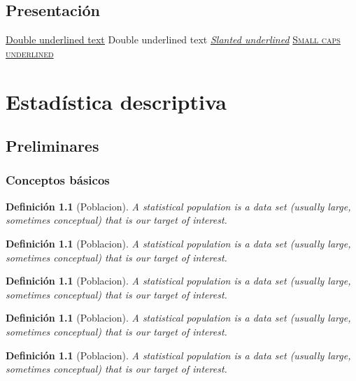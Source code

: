 \documentclass[a4paper]{report}
\newtheorem{defn}[thm]{Definición}
\begin{document}
\renewcommand\listtablename{Lista de tablas}
\listoftables
\newpage

\clearpage

\chapter*{Presentación}

\underline{\underline{Double underlined text}}
{Double underlined text}
\textsl{\underline{Slanted underlined}}
\textsc{\underline{Small caps underlined}}









\part{Estadística descriptiva}
\setcounter{page}{1}

\chapter{Preliminares}

\section{Conceptos básicos}

\begin{defn}[Poblacion]
  A statistical population is a data set (usually large, sometimes conceptual) that is our target of interest.
\end{defn}


\begin{defn}[Poblacion]
  A statistical population is a data set (usually large, sometimes conceptual) that is our target of interest.
\end{defn}
\begin{defn}[Poblacion]
  A statistical population is a data set (usually large, sometimes conceptual) that is our target of interest.
\end{defn}
\begin{defn}[Poblacion]
  A statistical population is a data set (usually large, sometimes conceptual) that is our target of interest.
\end{defn}
\begin{defn}[Poblacion]
  A statistical population is a data set (usually large, sometimes conceptual) that is our target of interest.
\end{defn}
\end{document}
